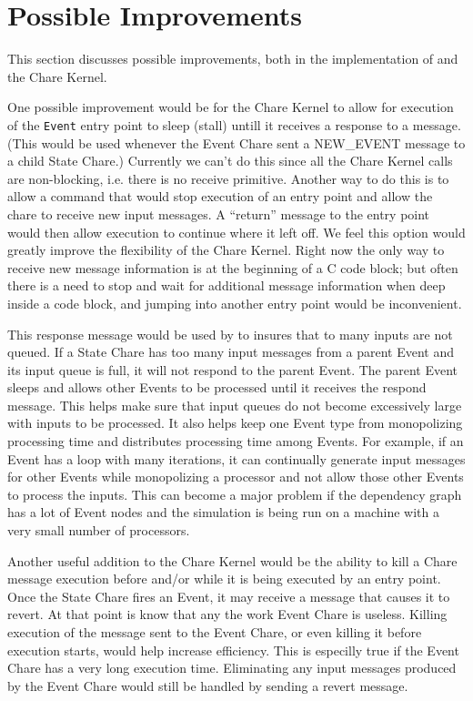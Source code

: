 \section{Possible Improvements}
\label{improvements}

This section discusses possible improvements, both in the implementation
of \dispare and the Chare Kernel.

One possible improvement would be for the Chare Kernel to allow for
execution of the {\tt Event} entry point to sleep (stall) untill it
receives a response to a message.  (This would be used whenever the
Event Chare sent a NEW\_EVENT message to a child State Chare.)
Currently we can't do this since all the Chare Kernel calls are
non-blocking, i.e.  there is no receive primitive.  Another way to do
this is to allow a command that would stop execution of an entry point
and allow the chare to receive new input messages.  A ``return'' message
to the entry point would then allow execution to continue where it left off.
We feel this option would greatly improve the flexibility of the Chare
Kernel.  Right now the only way to receive new message information is at
the beginning of a C code block; but often there is a need to stop
and wait for additional message information when deep inside a code
block, and jumping into another entry point would be inconvenient.

This response message would be used by \dispare to insures that to many
inputs are not queued.  If a State Chare has too many input messages
from a parent Event and its input queue is full, it will not
respond to the parent Event.  The parent Event sleeps and allows other
Events to be processed until it receives the respond message.  This
helps make sure that input queues do not become excessively large with
inputs to be processed.  It also helps keep one Event type from monopolizing
processing time and distributes processing time among Events.  For
example, if an Event has a loop with many iterations, it can continually
generate input messages for other Events while monopolizing a
processor and not allow those other Events to process the inputs.
This can become a major problem if the dependency graph has a lot of
Event nodes and the simulation is being run on a machine with a very
small number of processors.

Another useful addition to the Chare Kernel would be the ability to
kill a Chare message execution before and/or while it is being
executed by an entry point.  Once the State Chare fires an Event, it
may receive a message that causes it to revert.  At that point is know
that any the work Event Chare is useless.  Killing execution of the
message sent to the Event Chare, or even killing it before execution
starts, would help increase efficiency.  This is especilly true if the
Event Chare has a very long execution time.  Eliminating any input
messages produced by the Event Chare would still be handled by sending a
revert message.


